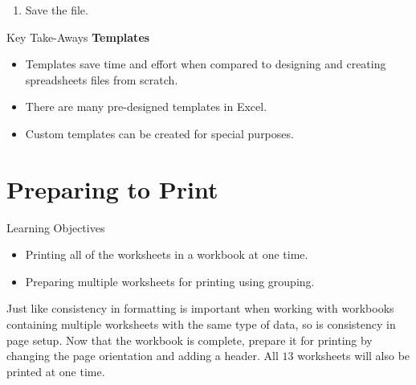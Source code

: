 \begin{enumerate}[resume]
	\item Save the file.
\end{enumerate}

\begin{center}
	\begin{tkwbox}{Key Take-Aways}
		\textbf{Templates}
		\\
		\begin{itemize}
			\setlength{\itemsep}{0pt}
			\setlength{\parskip}{0pt}
			\setlength{\parsep}{0pt}
			
			\item Templates save time and effort when compared to designing and creating spreadsheets files from scratch.
			\item There are many pre-designed templates in Excel.
			\item Custom templates can be created for special purposes.
			
		\end{itemize}
	\end{tkwbox}
\end{center}

\section{Preparing to Print}

\begin{center}
	\begin{objbox}{Learning Objectives}
		\begin{itemize}
			\setlength{\itemsep}{0pt}
			\setlength{\parskip}{0pt}
			\setlength{\parsep}{0pt}
			
			\item Printing all of the worksheets in a workbook at one time.
			\item Preparing multiple worksheets for printing using grouping.
			
		\end{itemize}
	\end{objbox}
\end{center}

Just like consistency in formatting is important when working with workbooks containing multiple worksheets with the same type of data, so is consistency in page setup. Now that the  workbook is complete, prepare it for printing by changing the page orientation and adding a header. All $ 13 $ worksheets will also be printed at one time.

